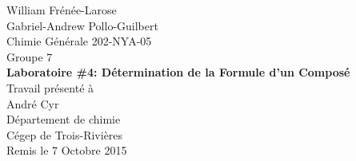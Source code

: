 \begin{titlepage}
\begin{center}
	William Frénée-Larose\\
	Gabriel-Andrew Pollo-Guilbert
	\\[36mm]
	Chimie Générale 202-NYA-05\\
	Groupe 7
	\\[36mm]
	\textbf{Laboratoire \#4: Détermination de la Formule d'un Composé}
	\\[36mm]
	Travail présenté à\\
	André Cyr
	\\[36mm]
	Département de chimie\\
	Cégep de Trois-Rivières\\
	Remis le 7 Octobre 2015\\
\end{center}
\end{titlepage}
